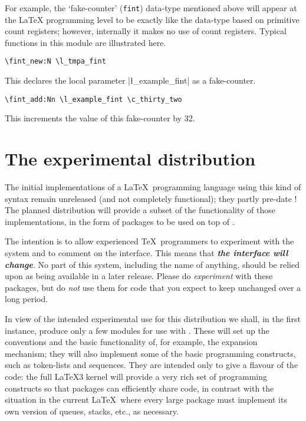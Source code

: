\documentclass{article}
\begin{document}
For example, the `fake-counter' (\texttt{fint}) data-type mentioned
above will appear at the \LaTeX{} programming level to be exactly like
the data-type based on primitive count registers; however, internally
it makes no use of count registers.  Typical functions in this module
are illustrated here.

\begin{verbatim}
\fint_new:N \l_tmpa_fint
\end{verbatim}
This declares the local parameter |\l_example_fint| as a fake-counter.

\begin{verbatim}
\fint_add:Nn \l_example_fint \c_thirty_two
\end{verbatim}
This increments the value of this fake-counter by 32.  


\section{The experimental distribution}
\label{sec:dist}

The initial implementations of a \LaTeX\ programming language using
this kind of syntax remain unreleased (and not completely functional);
they partly pre-date \LaTeXe!  The planned distribution will provide a
subset of the functionality of those implementations, in the form of
packages to be used on top of \LaTeXe.

The intention is to allow experienced \TeX\ programmers to experiment
with the system and to comment on the interface. This means that
\textbf{\itshape the interface will change}. No part of this system,
including the name of anything, should be relied upon as being
available in a later release.  Please do \emph{experiment} with these
packages, but do \emph{not} use them for code that you expect to keep
unchanged over a long period.

In view of the intended experimental use for this distribution we
shall, in the first instance, produce only a few modules for use with
\LaTeXe.  These will set up the conventions and the basic functionality
of, for example, the expansion mechanism; they will also implement some
of the basic programming constructs, such as token-lists and sequences.
They are intended only to give a flavour of the code: the full \LaTeX3
kernel will provide a very rich set of programming constructs so that
packages can efficiently share code, in contrast with the situation in
the current \LaTeX\ where every large package must implement its own
version of queues, stacks, etc., as necessary.
\end{document}
